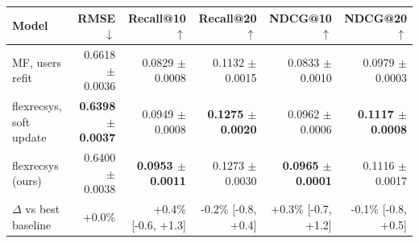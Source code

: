 \begin{tabular}{lrrrrr}
\toprule
Model & RMSE $\downarrow$ & Recall@10 $\uparrow$ & Recall@20 $\uparrow$ & NDCG@10 $\uparrow$ & NDCG@20 $\uparrow$ \\
\midrule
MF, users refit & 0.6618 $\pm$ 0.0036 & 0.0829 $\pm$ 0.0008 & 0.1132 $\pm$ 0.0015 & 0.0833 $\pm$ 0.0010 & 0.0979 $\pm$ 0.0003 \\
flexrecsys, soft update & \textbf{0.6398 $\pm$ 0.0037} & 0.0949 $\pm$ 0.0008 & \textbf{0.1275 $\pm$ 0.0020} & 0.0962 $\pm$ 0.0006 & \textbf{0.1117 $\pm$ 0.0008} \\
flexrecsys (ours) & 0.6400 $\pm$ 0.0038 & \textbf{0.0953 $\pm$ 0.0011} & 0.1273 $\pm$ 0.0030 & \textbf{0.0965 $\pm$ 0.0001} & 0.1116 $\pm$ 0.0017 \\
\midrule
$\Delta$ vs best baseline & +0.0\% & +0.4\% [-0.6, +1.3] & -0.2\% [-0.8, +0.4] & +0.3\% [-0.7, +1.2] & -0.1\% [-0.8, +0.5] \\
\bottomrule
\end{tabular}
